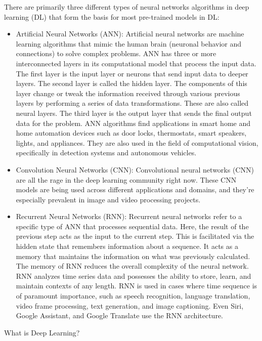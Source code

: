 \documentclass[11pt]{article}
\begin{document}
There are primarily three different types of neural networks algorithms in deep learning (DL) that form the basis for most pre-trained models in DL:

\begin{itemize}
\item Artificial Neural Networks (ANN): Artificial neural networks are machine learning algorithms that mimic the human brain (neuronal behavior and connections) to solve complex problems. ANN has three or more interconnected layers in its computational model that process the input data. The first layer is the input layer or neurons that send input data to deeper layers. The second layer is called the hidden layer. The components of this layer change or tweak the information received through various previous layers by performing a series of data transformations. These are also called neural layers. The third layer is the output layer that sends the final output data for the problem. ANN algorithms find applications in smart home and home automation devices such as door locks, thermostats, smart speakers, lights, and appliances. They are also used in the field of computational vision, specifically in detection systems and autonomous vehicles.
\item Convolution Neural Networks (CNN): Convolutional neural networks (CNN) are all the rage in the deep learning community right now. These CNN models are being used across different applications and domains, and they’re especially prevalent in image and video processing projects.
\item Recurrent Neural Networks (RNN): Recurrent neural networks refer to a specific type of ANN that processes sequential data. Here, the result of the previous step acts as the input to the current step. This is facilitated via the hidden state that remembers information about a sequence. It acts as a memory that maintains the information on what was previously calculated. The memory of RNN reduces the overall complexity of the neural network. RNN analyzes time series data and possesses the ability to store, learn, and maintain contexts of any length. RNN is used in cases where time sequence is of paramount importance, such as speech recognition, language translation, video frame processing, text generation, and image captioning. Even Siri, Google Assistant, and Google Translate use the RNN architecture.
\end{itemize} 




What is Deep Learning?
\end{document}

